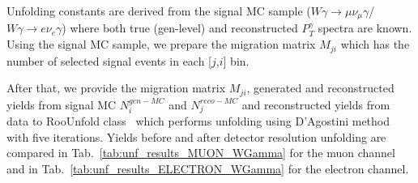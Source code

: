 
Unfolding constants are derived from the signal MC sample ($W\gamma\rightarrow\mu\nu_{\mu}\gamma$/$W\gamma\rightarrow{e}\nu_{e}\gamma$) where both true (gen-level) and reconstructed $P_T^\gamma$ spectra are known. Using the signal MC sample, we prepare the migration matrix $M_{ji}$ which has the number of selected signal events in each [$j$,$i$] bin. 

After that, we provide the migration matrix $M_{ji}$, generated and reconstructed yields from signal MC $N^{gen-MC}_i$ and $N^{reco-MC}_j$ and reconstructed yields from data to RooUnfold class~\cite{ref_RooUnfold} which performs unfolding using D'Agostini method with five iterations. Yields before and after detector resolution unfolding are compared in Tab.~\ref{tab:unf_results_MUON_WGamma} for the muon channel and in Tab.~\ref{tab:unf_results_ELECTRON_WGamma} for the electron channel. 

